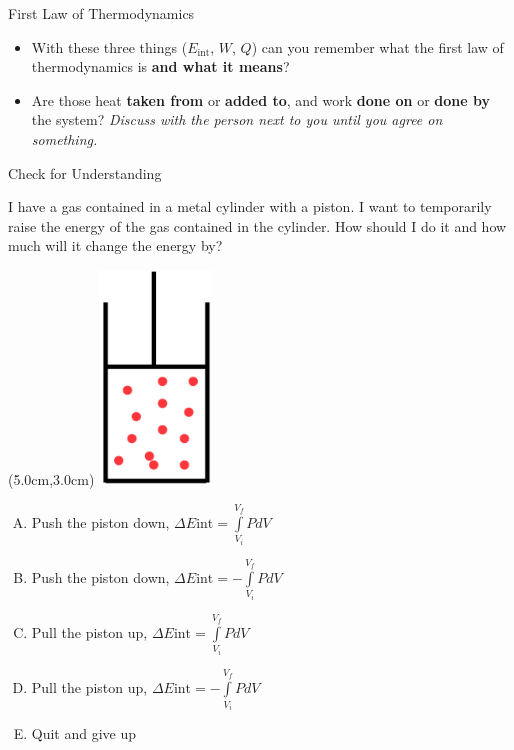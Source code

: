 \documentclass{beamer}
\newcommand{\red}[1]{{\color{red}{#1}}}
\newcommand{\checkl}[2]{\begin{textblock*}{1cm}(#1,#2){\large \red{\Checkmark}}\end{textblock*}}
\begin{document}
\begin{frame}[t]{First Law of Thermodynamics}
\begin{itemize}
   \item With these three things ($E_\text{int}$, $W$, $Q$) can you remember what the first law of thermodynamics is {\bf and what it means}?
   \item<3-> Are those heat {\bf taken from} or {\bf added to}, and work {\bf done on} or {\bf done by} the system? {\it Discuss with the person next to you until you agree on something.}
\end{itemize}
\end{frame}

\begin{frame}[t]{Check for Understanding}
\begin{center}
   I have a gas contained in a metal cylinder with a piston. I want to temporarily raise the energy of the gas contained in the cylinder. How should I do it and how much will it change the energy by?
   \begin{textblock*}{\textwidth}(5.0cm,3.0cm) %
      \includegraphics[width=3.0cm]{figures/mypiston.png}
   \end{textblock*}
   \begin{enumerate}[A.]
      \item Push the piston down, $\Delta E\text{int} = \int\limits_{V_i}^{V_f} PdV$
      \item Push the piston down, $\Delta E\text{int} = -\int\limits_{V_i}^{V_f} PdV$
      \item Pull the piston up, $\Delta E\text{int} = \int\limits_{V_i}^{V_f} PdV$
      \item Pull the piston up, $\Delta E\text{int} = -\int\limits_{V_i}^{V_f} PdV$
      \item Quit and give up
   \end{enumerate}
\only<2>{\checkl{0.5cm}{4.0cm}}
\end{center}
\end{frame}
\end{document}
